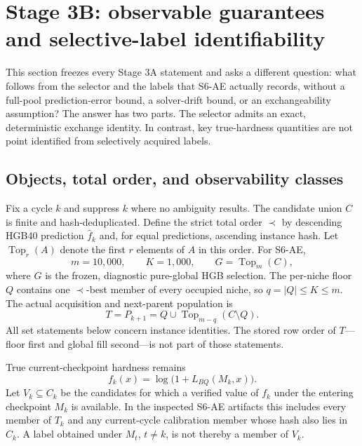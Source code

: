 \section{Stage 3B: observable guarantees and selective-label identifiability}
\label{sec:stage3b-identifiability}

This section freezes every Stage 3A statement and asks a different question:
what follows from the selector and the labels that S6-AE actually records,
without a full-pool prediction-error bound, a solver-drift bound, or an
exchangeability assumption?  The answer has two parts.  The selector admits
an exact, deterministic exchange identity.  In contrast, key true-hardness
quantities are not point identified from selectively acquired labels.

\subsection{Objects, total order, and observability classes}

Fix a cycle $k$ and suppress $k$ where no ambiguity results.  The candidate
union $C$ is finite and hash-deduplicated.  Define the strict total order
$\prec$ by descending HGB40 prediction $\widehat f_k$ and, for equal
predictions, ascending instance hash.  Let $\operatorname{Top}_r(A)$ denote
the first $r$ elements of $A$ in this order.  For S6-AE,
\[
  m=10{,}000,\qquad K=1{,}000,\qquad
  G=\operatorname{Top}_m(C),
\]
where $G$ is the frozen, diagnostic pure-global HGB selection.  The per-niche
floor $Q$ contains one $\prec$-best member of every occupied niche, so
$q=|Q|\le K\le m$.  The actual acquisition and next-parent population is
\[
  T=P_{k+1}
   =Q\cup \operatorname{Top}_{m-q}(C\setminus Q).
\]
All set statements below concern instance identities.  The stored row order of
$T$---floor first and global fill second---is not part of those statements.

True current-checkpoint hardness remains
\[
  f_k(x)=\log\!\bigl(1+L_{BQ}(M_k,x)\bigr).
\]
Let $V_k\subseteq C_k$ be the candidates for which a verified value of $f_k$
under the entering checkpoint $M_k$ is available.  In the inspected S6-AE
artifacts this includes every member of $T_k$ and any current-cycle calibration
member whose hash also lies in $C_k$.  A label obtained under $M_t$, $t\ne k$,
is not thereby a member of $V_k$.

